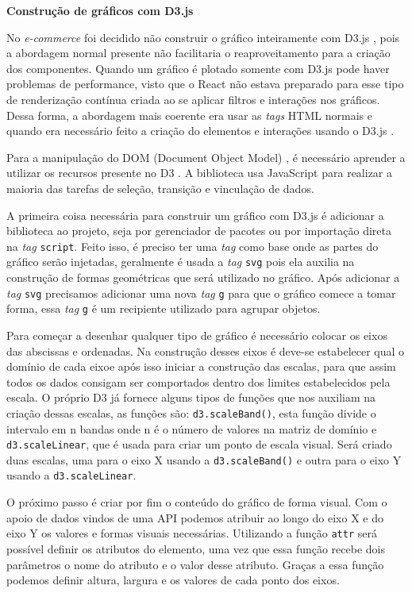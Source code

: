 \vspace{1cm}
{\centerline{\textbf{Construção de gráficos com D3.js}}}
No \textit{e-commerce} foi decidido não construir o gráfico inteiramente com D3.js \cite{D3}, pois a abordagem normal presente não facilitaria o reaproveitamento para a criação dos componentes. Quando um gráfico é plotado somente com D3.js \cite{D3} pode haver problemas de performance, visto que o React \cite{REACT} não estava preparado para esse tipo de renderização contínua criada ao se aplicar filtros e interações nos gráficos. Dessa forma, a abordagem mais coerente era usar as \textit{tags} HTML \cite{HTML} normais e quando era necessário feito a criação do elementos e interações usando o D3.js \cite{D3}.

Para a manipulação do DOM (Document Object Model) \cite{DOM}, é necessário aprender a utilizar os recursos presente no D3 \cite{D3}. A biblioteca usa JavaScript para realizar a maioria das tarefas de seleção, transição e vinculação de dados.

A primeira coisa necessária para construir um gráfico com D3.js \cite{D3} é adicionar a biblioteca ao projeto, seja por gerenciador de pacotes ou por importação direta na \textit{tag} \lstinline{script}. Feito isso, é preciso ter uma \textit{tag} como base onde as partes do gráfico serão injetadas, geralmente é usada a \textit{tag} \lstinline{svg} pois ela auxilia na construção de formas geométricas que será utilizado no gráfico. Após adicionar a \textit{tag} \lstinline{svg} precisamos adicionar uma nova \textit{tag} \lstinline{g} para que o gráfico comece a tomar forma, essa \textit{tag} \lstinline{g} é um recipiente utilizado para agrupar objetos.

Para começar a desenhar qualquer tipo de gráfico é necessário colocar os eixos das abscissas e ordenadas. Na construção desses eixos é deve-se estabelecer qual o domínio de cada  eixoe após isso iniciar a construção das escalas, para que assim todos os dados consigam ser comportados dentro dos limites estabelecidos pela escala. O próprio D3 \cite{D3} já fornece alguns tipos de funções que nos auxiliam na criação dessas escalas, as funções são: \lstinline{d3.scaleBand()}, esta função divide o intervalo em n bandas onde n é o número de valores na matriz de domínio e \lstinline{d3.scaleLinear}, que é usada para criar um ponto de escala visual. Será criado duas escalas, uma para o eixo X usando a \lstinline{d3.scaleBand()} e outra para o eixo Y usando a \lstinline{d3.scaleLinear}.

O próximo passo é criar por fim o conteúdo do gráfico de forma visual. Com o apoio de dados vindos de uma API podemos atribuir ao longo do eixo X e do eixo Y os valores e formas visuais necessárias. Utilizando a função \lstinline{attr} será possível definir os atributos do elemento, uma vez que essa função recebe dois parâmetros o nome do atributo e o valor desse atributo. Graças a essa função podemos definir altura, largura e os valores de cada ponto dos eixos.

